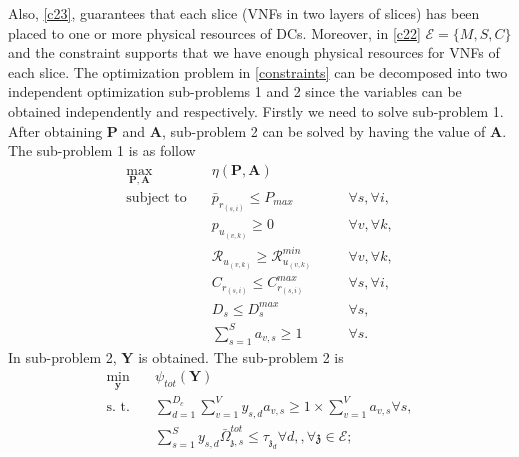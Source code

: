 \documentclass[conference]{IEEEtran}
\begin{document}
Also, \eqref{c23}, guarantees that each slice (VNFs in two layers of slices) has been placed to one or more physical resources of DCs. Moreover, in \eqref{c22}  $\mathcal{E} = \{M,S,C\}$ and the constraint supports
that we have enough physical resources for VNFs of each slice.\newline
The optimization problem in \eqref{constraints} can be decomposed into two independent optimization sub-problems 1 and 2 since the variables can be obtained independently and respectively. Firstly we need to solve sub-problem 1. After obtaining $\boldsymbol{P}$ and $ \boldsymbol{A}$, sub-problem 2 can be solved by having the value of $ \boldsymbol{A}$. 
The sub-problem 1 is as follow
\begin{subequations}
\begin{alignat}{4}
\max\limits_{\boldsymbol{P}, \boldsymbol{A} }   \quad &   \eta(\boldsymbol{P},\boldsymbol{A})\\
\text{subject to} \quad  & \bar{p}_{r_{(s,i)}} \leq P_{max} && \quad \forall s, \forall i,   \\
&p_{u_{(v,k)}}  \geq 0  &&\quad \forall v, \forall k, \\
&\mathcal{R}_{u_{(v,k)}} \geq  \mathcal{R}_{u_{(v,k)}}^{min} && \quad \forall v, \forall k, \\
&C_{r_{(s,i)}} \leq C_{r_{(s,i)}}^{max}  &&\quad \forall s, \forall i,\label{cc14} \\
&D_{s} \leq D_{s}^{max}  &&\quad \forall s, \label{cc15} \\
& \textstyle  \sum_{s=1}^{S}a_{v,s} \geq 1 &&\quad \forall s.
\end{alignat}
\label{constraints1}
\end{subequations}
In sub-problem 2, $ \boldsymbol{Y}$ is obtained. The sub-problem 2 is
\begin{subequations}
\begin{alignat}{4}
\min\limits_{\boldsymbol{y} }   \quad &   \psi_{tot}(\boldsymbol{Y})\\
\text{s. t.} \quad & \textstyle \sum_{d=1}^{D_c}\sum_{v=1}^{V}y_{s,d}a_{v,s} \geq 1\times\sum_{v=1}^{V}a_{v,s} \forall s, \\
 &\textstyle  \sum_{s=1}^{S} y_{s,d} \bar{\Omega}_{\mathfrak{z},s}^{tot}  \leq   \tau_{\mathfrak{z}_d}  \forall d,, \forall \mathfrak{z}\in \mathcal{E};  \label{eqomega}
\end{alignat}
\label{constraints2}
\end{subequations}





\end{document}
